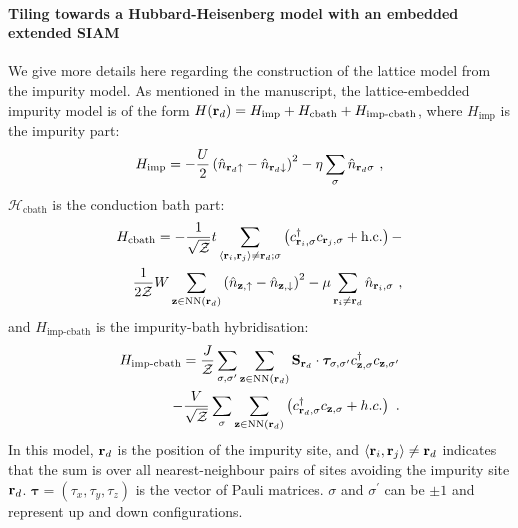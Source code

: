 \documentclass[%
 reprint,
superscriptaddress,
groupedaddress,
 amsmath,amssymb,
 aps,
prl,superscriptaddress
]{revtex4-2}
\begin{document}
\paragraph*{Tiling towards a Hubbard-Heisenberg model with an embedded extended SIAM}
We give more details here regarding the construction of the lattice model from the impurity model. As mentioned in the manuscript, the lattice-embedded impurity model is of the form $H({\bf r}_d) = H_\text{imp} + H_\text{cbath} + H_\text{imp-cbath}$, where $H_\text{imp}$ is the impurity part:
\begin{equation}\begin{aligned}\label{onsiteHamiltonian}
	H_\text{imp} = -\frac{U}{2}\left(\hat n_{{\bf r}_d \uparrow} - \hat n_{{\bf r}_d \downarrow} \right)^2 - \eta\sum_\sigma \hat n_{{\bf r}_d\sigma}~,
\end{aligned}\end{equation}
\(\mathcal{H}_\text{cbath}\) is the conduction bath part:
\begin{equation}\begin{aligned}\label{bathHamiltonian}
	{H}_\text{cbath} = -\frac{1}{\sqrt\mathcal{Z}}t\sum_{\left<{\bf r}_i, {\bf r}_j\right>\neq{\bf r}_d;\sigma}\left(c^\dagger_{{\bf r}_i,\sigma}c_{{\bf r}_j,\sigma} + \text{h.c.}\right) - \\
    \frac{1}{2 \mathcal{Z}}W\sum_{{\bf z}\in\text{NN}({\bf r}_d)}\left(\hat n_{{\bf z}, \uparrow} - \hat n_{{\bf z}, \downarrow}\right)^2 - \mu \sum_{{\bf r}_i \neq {\bf r}_d}\hat n_{{\bf r}_i,\sigma}~,
\end{aligned}\end{equation}
and ${H}_\text{imp-cbath}$ is the impurity-bath hybridisation:
\begin{equation}\begin{aligned}\label{interactionHamiltonian}
	{H}_\text{imp-cbath} = \frac{J}{\mathcal{Z}}\sum_{\sigma,\sigma^\prime}\sum_{{\bf z}\in\text{NN}({\bf r}_d)} {\bf S}_{{\bf r}_d}\cdot{\boldsymbol \tau}_{\sigma,\sigma^\prime}c^\dagger_{{\bf z},\sigma}c_{{\bf z},\sigma^\prime} \\
    - \frac{V}{\sqrt{\mathcal{Z}}}\sum_{\sigma} \sum_{{\bf z}\in\text{NN}({\bf r}_d)}\left(c^\dagger_{{\bf r}_d,\sigma} c_{{{\bf z}},\sigma} + h.c.\right)~.
\end{aligned}\end{equation}
In this model, ${\bf r}_d$ is the position of the impurity site, and \(\left<{\bf r}_i, {\bf r}_j\right>\neq {\bf r}_d\) indicates that the sum is over all nearest-neighbour pairs of sites avoiding the impurity site \({\bf r}_d\). \(\boldsymbol \tau = \left( \tau_x, \tau_y, \tau_z \right) \) is the vector of Pauli matrices. \(\sigma\) and \(\sigma^\prime\) can be \(\pm 1\) and represent up and down configurations.
\end{document}
